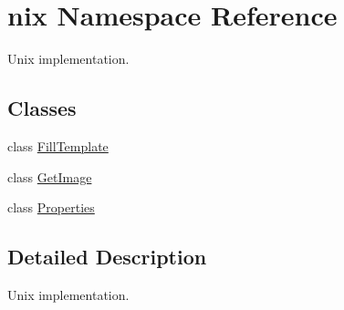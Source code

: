 \hypertarget{namespacenix}{}\section{nix Namespace Reference}
\label{namespacenix}


Unix implementation.  


\subsection*{Classes}
\begin{DoxyCompactItemize}
\item 
class \hyperlink{classnix_1_1FillTemplate}{Fill\+Template}
\item 
class \hyperlink{classnix_1_1GetImage}{Get\+Image}
\item 
class \hyperlink{classnix_1_1Properties}{Properties}
\end{DoxyCompactItemize}


\subsection{Detailed Description}
Unix implementation. 
